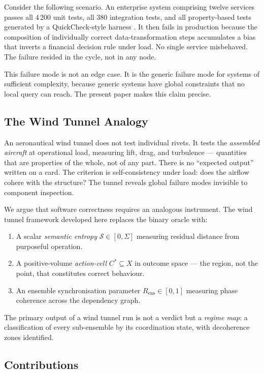 \documentclass[twocolumn,a4paper,11pt]{article}
\theoremstyle{plain}
\theoremstyle{definition}
\theoremstyle{remark}
\begin{document}
Consider the following scenario. An enterprise system comprising twelve
services passes all 4\,200 unit tests, all 380 integration tests, and all
property-based tests generated by a QuickCheck-style harness
\cite{claessen2000}. It then fails in production because the composition
of individually correct data-transformation steps accumulates a bias that
inverts a financial decision rule under load. No single service
misbehaved. The failure resided in the cycle, not in any node.

This failure mode is not an edge case. It is the generic failure mode for
systems of sufficient complexity, because generic systems have global
constraints that no local query can reach. The present paper makes this
claim precise.

\subsection{The Wind Tunnel Analogy}

An aeronautical wind tunnel does not test individual rivets. It tests the
\emph{assembled aircraft} at operational load, measuring lift, drag, and
turbulence --- quantities that are properties of the whole, not of any
part. There is no ``expected output'' written on a card. The criterion is
self-consistency under load: does the airflow cohere with the structure?
The tunnel reveals global failure modes invisible to component inspection.

We argue that software correctness requires an analogous instrument. The
wind tunnel framework developed here replaces the binary oracle with:
\begin{enumerate}[leftmargin=*]
  \item A scalar \emph{semantic entropy} $\mathcal{S} \in [0, \Sigma]$
        measuring residual distance from purposeful operation.
  \item A positive-volume \emph{action-cell} $C^* \subseteq X$ in outcome
        space --- the region, not the point, that constitutes correct
        behaviour.
  \item An ensemble synchronisation parameter $R_\mathrm{ens} \in [0,1]$
        measuring phase coherence across the dependency graph.
\end{enumerate}
The primary output of a wind tunnel run is not a verdict but a
\emph{regime map}: a classification of every sub-ensemble by its
coordination state, with decoherence zones identified.

\subsection{Contributions}
\end{document}
